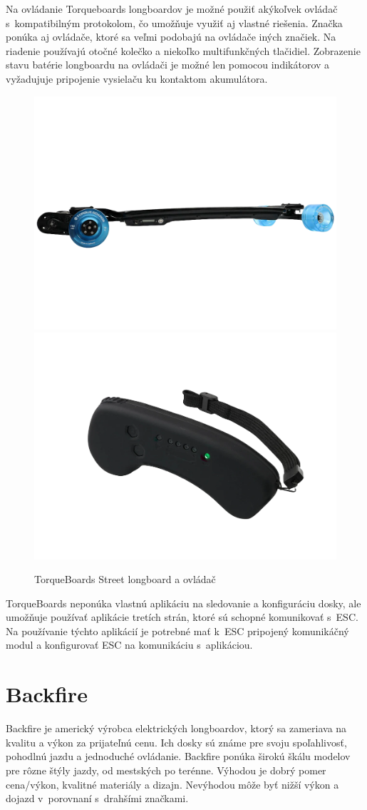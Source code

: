 Na ovládanie Torqueboards longboardov je možné použiť akýkoľvek ovládač s~kompatibilným protokolom, čo umožňuje využiť aj vlastné riešenia.
Značka ponúka aj ovládače, ktoré sa veľmi podobajú na ovládače iných značiek.
Na riadenie používajú otočné kolečko a niekoľko multifunkčných tlačidiel.
Zobrazenie stavu batérie longboardu na ovládači je možné len pomocou indikátorov a vyžadujuje pripojenie vysielaču ku kontaktom akumulátora. 

\begin{figure}[h]
    \centering
    \includegraphics[width=0.48\linewidth]{obrazky-figures/brand-reviews/torque-longboard.png}\hfill
    \includegraphics[width=0.48\linewidth]{obrazky-figures/brand-reviews/torque-controller.png}
    \caption{TorqueBoards Street longboard a ovládač\cite{TorqueBoards}}\label{fig:torqueboards}
\end{figure}

TorqueBoards neponúka vlastnú aplikáciu na sledovanie a konfiguráciu dosky, ale umožňuje používať aplikácie tretích strán, ktoré sú schopné komunikovať s~ESC.
Na používanie týchto aplikácií je potrebné mať k~ESC pripojený komunikáčný modul a konfigurovať ESC na komunikáciu s~aplikáciou.\cite{TorqueBoards}

\section{Backfire}
Backfire je americký výrobca elektrických longboardov, ktorý sa zameriava na kvalitu a výkon za prijateľnú cenu.
Ich dosky sú známe pre svoju spoľahlivosť, pohodlnú jazdu a jednoduché ovládanie.
Backfire ponúka širokú škálu modelov pre rôzne štýly jazdy, od mestských po terénne.
Výhodou je dobrý pomer cena/výkon, kvalitné materiály a dizajn.
Nevýhodou môže byť nižší výkon a dojazd v~porovnaní s~drahšími značkami.

